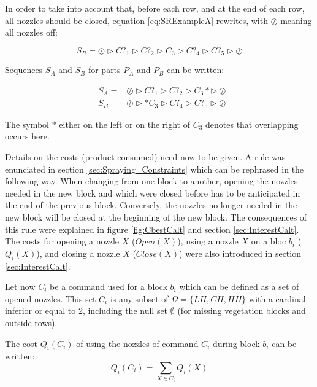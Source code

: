 In order to take into account that, before each row, and at the end of each row, all nozzles should be closed, equation \ref{eq:SRExampleA} rewrites, with $\oslash$ meaning all nozzles off:

\begin{equation}
	S_R = \oslash \triangleright C?_{1} \triangleright C?_{2} \triangleright C_{3} \triangleright C?_{4} \triangleright C?_{5} \triangleright \oslash \label{eq:SRExample_r_anxA}
\end{equation}

Sequences $S_A$ and $S_B$ for parts $P_A$ and $P_B$ can be written:

\begin{eqnarray}
	&S_A =& \oslash \triangleright C?_1 \triangleright C?_2 \triangleright C_{3}* \triangleright \oslash \label{eq:SAExample_r_anxA}
	\\
	&S_B =& \oslash \triangleright *C_{3} \triangleright C?_4 \triangleright C?_5 \triangleright \oslash \label{eq:SBExample_r_anxA}
\end{eqnarray}

The symbol $*$ either on the left or on the right of $C_3$ denotes that overlapping occurs here. 

Details on the costs (product consumed) need now to be given. A rule was enunciated in section \ref{sec:Spraying_Constraints} which can be rephrased in the following way. When changing from one block to another, opening the nozzles needed in the new block and which were closed before has to be anticipated in the end of the previous block. Conversely, the nozzles no longer needed in the new block will be closed at the beginning of the new block. The consequences of this rule were explained in figure \ref{fig:CbestCalt} and section \ref{sec:InterestCalt}. The costs  for opening a nozzle $X$ ($Open(X)$), using a nozzle $X$ on a bloc $b_i$ ($Q_i(X)$), and closing a nozzle $X$ ($Close(X)$) were also introduced in section \ref{sec:InterestCalt}.

Let now $C_i$ be a command used for a block $b_i$ which can be defined as a set of opened nozzles. This set $C_i$ is any subset of $\Omega=\{LH,CH,HH\}$ with a cardinal inferior or equal to 2, including the null set $\emptyset$ (for missing vegetation blocks and outside rows).

The cost $Q_i(C_i)$ of using the nozzles of command $C_i$ during block $b_i$ can be written:
\begin{equation}
	Q_i(C_i)=\sum\limits_{X \in C_i} Q_i(X)
\end{equation}

